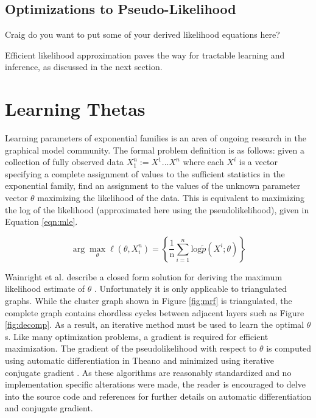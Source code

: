 \documentclass{article} %
\begin{document}
\subsection{Optimizations to Pseudo-Likelihood}
Craig do you want to put some of your derived likelihood equations here?

Efficient likelihood approximation paves the way for tractable learning and inference, as discussed in the next section.

\section{Learning Thetas}
Learning parameters of exponential families is an area of ongoing research in the graphical model community. The formal problem definition is as follows: given a collection of fully observed data $X_1^n := {X^1...X^n}$ where each $X^i$ is a vector specifying a complete assignment of values to the sufficient statistics in the exponential family, find an assignment to the values of the unknown parameter vector $\theta$ maximizing the likelihood of the data. This is equivalent to maximizing the log of the likelihood (approximated here using the pseudolikelihood), given in Equation \ref{eqn:mle}.

\begin{equation}
\arg\max_\theta \ell(\theta,X_i^n)
=
\left\{
  \frac{1}{\textrm{n}}\sum_{i=1}^{n}\textrm{log}\tilde{p}(X^i; \theta)
\right\}
\label{eqn:mle}
\end{equation}

Wainright et al. describe a closed form solution for deriving the maximum likelihood estimate of $\theta$ \cite{wainwright08}. Unfortunately it is only applicable to triangulated graphs. While the cluster graph shown in Figure \ref{fig:mrf} is triangulated, the complete graph contains chordless cycles between adjacent layers such as Figure \ref{fig:decomp}. As a result, an iterative method must be used to learn the optimal $\theta$s. Like many optimization problems, a gradient is required for efficient maximization. The gradient of the pseudolikelihood with respect to $\theta$ is computed using automatic differentiation in Theano \cite{bergstra10} and minimized using iterative conjugate gradient \cite{hestenes52}. As these algorithms are reasonably standardized and no implementation specific alterations were made, the reader is encouraged to delve into the source code and references for further details on automatic differentiation and conjugate gradient.
\end{document}
